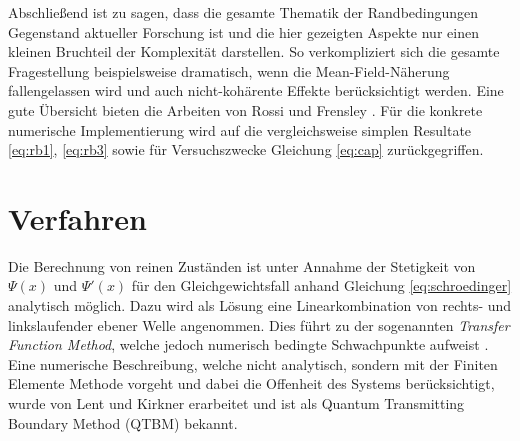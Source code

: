 Abschließend ist zu sagen, dass die gesamte Thematik der Randbedingungen Gegenstand aktueller Forschung ist und die hier gezeigten Aspekte nur einen kleinen Bruchteil der Komplexität darstellen. So verkompliziert sich die gesamte Fragestellung beispielsweise dramatisch, wenn die Mean-Field-Näherung fallengelassen wird und auch nicht-kohärente Effekte berücksichtigt werden. Eine gute Übersicht bieten die Arbeiten von Rossi \cite{buchRossi} und Frensley \cite{frensley}. Für die konkrete numerische Implementierung wird auf die vergleichsweise simplen Resultate \eqref{eq:rb1}, \eqref{eq:rb3} sowie für Versuchszwecke Gleichung \eqref{eq:cap} zurückgegriffen.

\section{Verfahren}
Die Berechnung von reinen Zuständen ist unter Annahme der Stetigkeit von $\Psi(x)$ und $\Psi'(x)$ für den Gleichgewichtsfall anhand Gleichung \eqref{eq:schroedinger} analytisch möglich. Dazu wird als Lösung eine Linearkombination von rechts- und linkslaufender ebener Welle angenommen. Dies führt zu der sogenannten \emph{Transfer Function Method}, welche jedoch numerisch bedingte Schwachpunkte aufweist \cite{frensley3}. Eine numerische Beschreibung, welche nicht analytisch, sondern mit der Finiten Elemente Methode vorgeht und dabei die Offenheit des Systems berücksichtigt, wurde von Lent und Kirkner \cite{qtbm} erarbeitet und ist als Quantum Transmitting Boundary Method (QTBM) bekannt.



